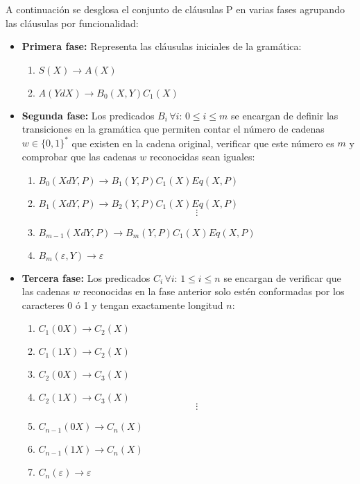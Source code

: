 \documentclass[12pt]{article}
\begin{document}
A continuación se desglosa el conjunto de cláusulas P en varias fases agrupando las cláusulas por funcionalidad:
\begin{itemize}
    \item  \textbf{Primera fase:} Representa las cláusulas iniciales de la gramática:
          \begin{enumerate}
              \item $S(X)\to A(X)$
              \item $A(YdX)\to B_0(X,Y)C_1(X)$
          \end{enumerate}

    \item \textbf{Segunda fase:} Los predicados $B_i\,\forall i:\,0\leq i\leq m$ se encargan de definir las transiciones en la gramática
          que permiten contar el número de cadenas $w\in \{0,1\}^*$ que existen en la cadena original, verificar que
          este número es $m$ y comprobar que las cadenas $w$ reconocidas sean iguales:
          \begin{enumerate}[start=3]
              \item $B_0(XdY,P)\to B_1(Y,P) C_1(X) Eq(X,P)$
              \item $B_1(XdY,P)\to B_2(Y,P) C_1(X) Eq(X,P)$
                    $$\vdots$$
              \item $B_{m-1}(XdY,P)\to B_m(Y,P) C_1(X) Eq(X,P)$
              \item $B_m(\varepsilon,Y)\to \varepsilon$
          \end{enumerate}
    \item \textbf{Tercera fase:} Los predicados $C_i\,\forall i:\,1\leq i\leq n$ se encargan de verificar que las
          cadenas $w$ reconocidas en la fase anterior solo estén conformadas por los caracteres 0 ó 1 y tengan exactamente
          longitud $n$:
          \begin{enumerate}[start=7]
              \item $C_1(0X)\to C_2(X)$
              \item $C_1(1X)\to C_2(X)$
              \item $C_2(0X)\to C_3(X)$
              \item $C_2(1X)\to C_3(X)$
                    $$\vdots$$
              \item $C_{n-1}(0X)\to C_n(X)$
              \item $C_{n-1}(1X)\to C_n(X)$
              \item $C_n(\varepsilon)\to \varepsilon$
          \end{enumerate}
\end{itemize}
\end{document}
